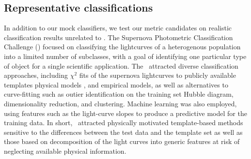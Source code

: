 %

\subsection{Representative classifications}
\label{sec:realdata}

In addition to our mock classifiers, we test our metric candidates on realistic classification results unrelated to \plasticc.
The Supernova Photometric Classification Challenge (\snphotcc) \citep{kessler_supernova_2010} focused on classifying the lightcurves of a heterogenous population into a limited number of subclasses, with a goal of identifying one particular type of object for a single scientific application.
The \snphotcc\ attracted diverse classification approaches, including $\chi^{2}$ fits of the supernova lightcurves to publicly available templates \citep{2002PASP..114..803N} physical models \citep{2008ApJ...681..482C}, and empirical models, as well as alternatives to curve-fitting such as
outier identification on the training set Hubble diagram, dimensionality reduction,
and clustering.
Machine learning was also employed, using features such as the light-curve slopes to produce a predictive model for the training data.
In short, \snphotcc\ attracted physically motivated template-based methods sensitive to the differences between the test data and the template set
as well as those based on decomposition of the light curves into generic features at risk of neglecting available physical information.

